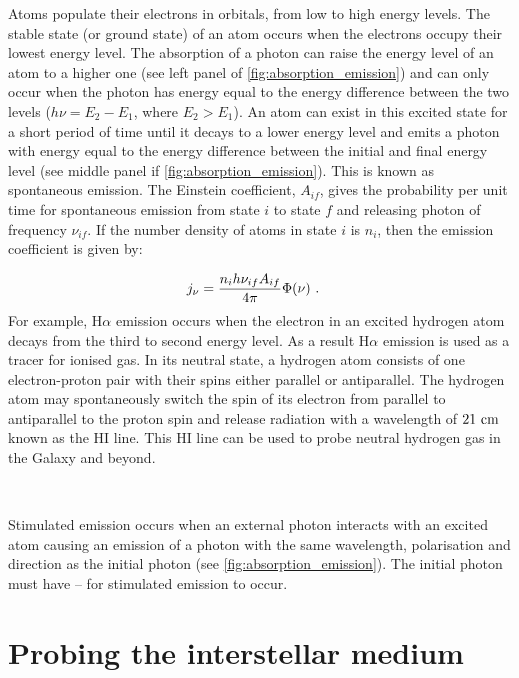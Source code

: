 Atoms populate their electrons in orbitals, from low to high energy levels. The stable state (or ground state) of an atom occurs when the electrons occupy their lowest energy level. The absorption of a photon can raise the energy level of an atom to a higher one (see left panel of \autoref{fig:absorption_emission}) and can only occur when the photon has energy equal to the energy difference between the two levels ($h\nu=E_2-E_1$, where $E_2>E_1$). An atom can exist in this excited state for a short period of time until it decays to a lower energy level and emits a photon with energy equal to the energy difference between the initial and final energy level (see middle panel if \autoref{fig:absorption_emission}). This is known as spontaneous emission. The Einstein coefficient, $A_{if}$, gives the probability per unit time for spontaneous emission from state $i$ to state $f$ and releasing photon of frequency $\nu_{if}$. If the number density of atoms in state $i$ is $n_i$, then the emission coefficient is given by:

\begin{equation}
	\begin{aligned}
		j_\nu&=\frac{n_ih\nu_{if}A_{if}}{4\pi}\Phi\qty(\nu)\text{ .}
	\end{aligned} \label{eq:interstellar_medium_emission_coefficient}
\end{equation}
\noindent For example, H$\alpha$ emission occurs when the electron in an excited hydrogen atom decays from the third to second energy level. As a result H$\alpha$ emission is used as a tracer for ionised gas. In its neutral state, a hydrogen atom consists of one electron-proton pair with their spins either parallel or antiparallel. The hydrogen atom may spontaneously switch the spin of its electron from parallel to antiparallel to the proton spin and release radiation with a wavelength of $21~\si{\centi\meter}$ known as the HI line. This HI line can be used to probe neutral hydrogen gas in the Galaxy and beyond.
\par~\par
Stimulated emission occurs when an external photon interacts with an excited atom causing an emission of a photon with the same wavelength, polarisation and direction as the initial photon (see \autoref{fig:absorption_emission}). The initial photon must have -- for stimulated emission to occur.

\section{Probing the interstellar medium} 

